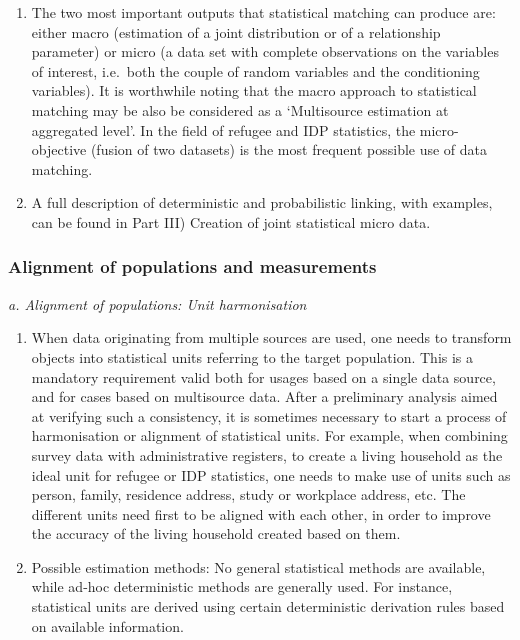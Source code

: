 \documentclass[
]{article}
\begin{document}
\begin{enumerate}
\def\labelenumi{\arabic{enumi}.}
\setcounter{enumi}{227}
\item
  The two most important outputs that statistical matching can
  produce are: either macro (estimation of a joint distribution or of
  a relationship parameter) or micro (a data set with complete
  observations on the variables of interest, i.e.~both the couple of
  random variables and the conditioning variables). It is worthwhile
  noting that the macro approach to statistical matching may be also
  be considered as a `Multisource estimation at aggregated level'. In
  the field of refugee and IDP statistics, the micro-objective (fusion
  of two datasets) is the most frequent possible use of data matching.
\item
  A full description of deterministic and probabilistic linking, with
  examples, can be found in Part III) Creation of joint statistical
  micro data.
\end{enumerate}

\hypertarget{d.3.-alignment-of-populations-and-measurements}{%
\subsubsection{Alignment of populations and measurements}\label{d.3.-alignment-of-populations-and-measurements}}

\emph{a. Alignment of populations: Unit harmonisation}

\begin{enumerate}
\def\labelenumi{\arabic{enumi}.}
\setcounter{enumi}{229}
\item
  When data originating from multiple sources are used, one needs to
  transform objects into statistical units referring to the target
  population. This is a mandatory requirement valid both for usages
  based on a single data source, and for cases based on multisource
  data. After a preliminary analysis aimed at verifying such a
  consistency, it is sometimes necessary to start a process of
  harmonisation or alignment of statistical units. For example, when
  combining survey data with administrative registers, to create a
  living household as the ideal unit for refugee or IDP statistics,
  one needs to make use of units such as person, family, residence
  address, study or workplace address, etc. The different units need
  first to be aligned with each other, in order to improve the
  accuracy of the living household created based on them.
\item
  Possible estimation methods: No general statistical methods are
  available, while ad-hoc deterministic methods are generally used.
  For instance, statistical units are derived using certain
  deterministic derivation rules based on available information.
\end{enumerate}
\end{document}
